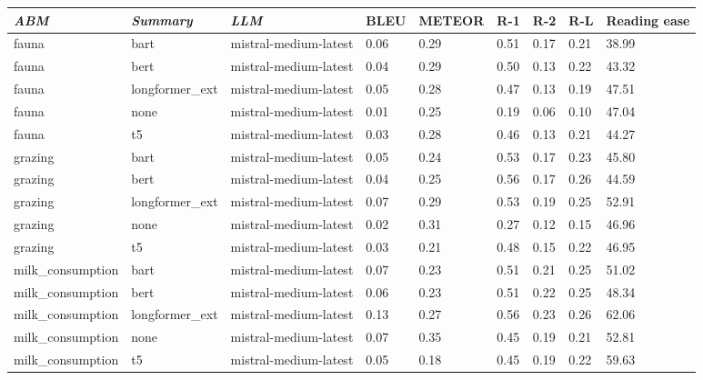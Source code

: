 \begin{tabular}{|l|l|l|l|l|l|l|l|l|}
\hline
\textit{\textbf{ABM}} & \textit{\textbf{Summary}} & \textit{\textbf{LLM}} & BLEU & METEOR & R-1 & R-2 & R-L & Reading ease \\
 \hline
 fauna & bart & mistral-medium-latest & 0.06 & 0.29 & 0.51 & 0.17 & 0.21 & 38.99 \\
 \hline
 fauna & bert & mistral-medium-latest & 0.04 & 0.29 & 0.50 & 0.13 & 0.22 & 43.32 \\
 \hline
 fauna & longformer\_ext & mistral-medium-latest & 0.05 & 0.28 & 0.47 & 0.13 & 0.19 & 47.51 \\
 \hline
 fauna & none & mistral-medium-latest & 0.01 & 0.25 & 0.19 & 0.06 & 0.10 & 47.04 \\
 \hline
 fauna & t5 & mistral-medium-latest & 0.03 & 0.28 & 0.46 & 0.13 & 0.21 & 44.27 \\
 \hline
 grazing & bart & mistral-medium-latest & 0.05 & 0.24 & 0.53 & 0.17 & 0.23 & 45.80 \\
 \hline
 grazing & bert & mistral-medium-latest & 0.04 & 0.25 & 0.56 & 0.17 & 0.26 & 44.59 \\
 \hline
 grazing & longformer\_ext & mistral-medium-latest & 0.07 & 0.29 & 0.53 & 0.19 & 0.25 & 52.91 \\
 \hline
 grazing & none & mistral-medium-latest & 0.02 & 0.31 & 0.27 & 0.12 & 0.15 & 46.96 \\
 \hline
 grazing & t5 & mistral-medium-latest & 0.03 & 0.21 & 0.48 & 0.15 & 0.22 & 46.95 \\
 \hline
 milk\_consumption & bart & mistral-medium-latest & 0.07 & 0.23 & 0.51 & 0.21 & 0.25 & 51.02 \\
 \hline
 milk\_consumption & bert & mistral-medium-latest & 0.06 & 0.23 & 0.51 & 0.22 & 0.25 & 48.34 \\
 \hline
 milk\_consumption & longformer\_ext & mistral-medium-latest & 0.13 & 0.27 & 0.56 & 0.23 & 0.26 & 62.06 \\
 \hline
 milk\_consumption & none & mistral-medium-latest & 0.07 & 0.35 & 0.45 & 0.19 & 0.21 & 52.81 \\
 \hline
 milk\_consumption & t5 & mistral-medium-latest & 0.05 & 0.18 & 0.45 & 0.19 & 0.22 & 59.63 \\
\hline
\end{tabular}
